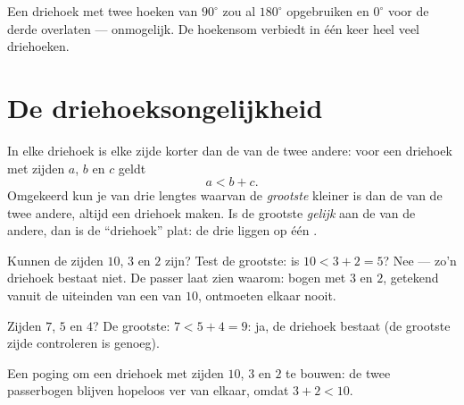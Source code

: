 \begin{example}\label{ex:g7:triangles:tworight}
Een driehoek met twee hoeken van $90^\circ$ zou al $180^\circ$ opgebruiken en
$0^\circ$ voor de derde overlaten --- onmogelijk. De hoekensom verbiedt in één keer
heel veel driehoeken.
\end{example}

\section{De driehoeksongelijkheid}

\begin{theorem}[Driehoeksongelijkheid]\label{thm:g7:triangles:inequality}
In elke driehoek is elke zijde korter dan de  van de twee andere: voor een
driehoek met zijden $a$, $b$ en $c$ geldt
\[
a < b + c .
\]
Omgekeerd kun je van drie lengtes waarvan de \emph{grootste} kleiner is dan de 
van de twee andere, altijd een driehoek maken. Is de grootste \emph{gelijk} aan de
 van de andere, dan is de ``driehoek'' plat: de drie  liggen op één
.
\end{theorem}
\admitted

\begin{example}\label{ex:g7:triangles:inequality}
Kunnen de zijden $10$, $3$ en $2$ zijn? Test de grootste: is
$10 < 3 + 2 = 5$? Nee --- zo'n driehoek bestaat niet. De passer laat zien waarom:
bogen met  $3$ en $2$, getekend vanuit de uiteinden van een  van $10$,
ontmoeten elkaar nooit.

Zijden $7$, $5$ en $4$? De grootste: $7 < 5 + 4 = 9$: ja, de driehoek bestaat (de
grootste zijde controleren is genoeg).
\end{example}

\begin{omfigure}

{\small Een poging om een driehoek met zijden $10$, $3$ en $2$ te bouwen: de twee
passerbogen blijven hopeloos ver van elkaar, omdat $3 + 2 < 10$.}
\end{omfigure}


